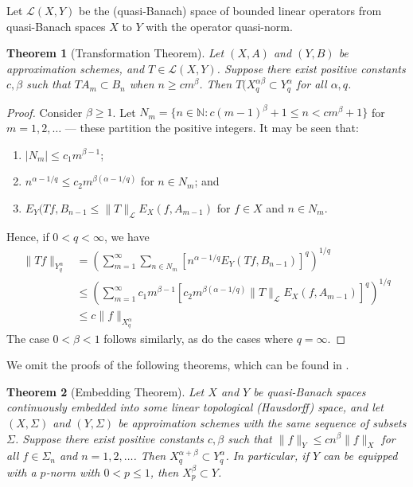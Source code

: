 \documentclass{article}
\newtheorem{theorem}{Theorem}[section]
\theoremstyle{definition}
\theoremstyle{remark}
\begin{document}
Let $\mathcal{L}(X,Y)$ be the (quasi-Banach) space of bounded linear operators from quasi-Banach spaces $X$ to $Y$ with the operator quasi-norm.

\begin{theorem}[Transformation Theorem]
    Let $(X,A)$ and $(Y,B)$ be approximation schemes, and $T \in \mathcal{L}(X,Y)$. Suppose there exist positive constants $c,\beta$ such that $TA_m \subset B_n$ when $n \geq cm^\beta$. Then $T(X_q^{\alpha\beta} \subset Y_q^\alpha$ for all $\alpha,q$. 
\end{theorem}

\begin{proof}
    Consider $\beta \geq 1$. Let $N_m = \{ n \in \mathbb{N}: c(m-1)^\beta + 1 \leq n < cm^\beta + 1 \}$ for $m = 1,2,\ldots$ --- these partition the positive integers. It may be seen that:
    \begin{enumerate}
        \item $|N_m| \leq c_1m^{\beta-1}$;
        \item $n^{\alpha-1/q} \leq c_2m^{\beta(\alpha-1/q)}$ for $n \in N_m$; and
        \item $E_Y(Tf,B_{n-1} \leq \lVert T \rVert_\mathcal{L}E_X(f,A_{m-1})$ for $f \in X$ and $n \in N_m$.
    \end{enumerate}
    Hence, if $0 < q < \infty$, we have
    \begin{align*}
        \lVert Tf \rVert_{Y_q^\alpha} &= \left( \sum_{m=1}^\infty \sum_{n \in N_m} [n^{\alpha-1/q}E_Y(Tf,B_{n-1})]^q \right)^{1/q} \\
        &\leq \left( \sum_{m=1}^\infty c_1m^{\beta-1}[c_2m^{\beta(\alpha-1/q)}\lVert T \rVert_\mathcal{L}E_X(f,A_{m-1})]^q \right)^{1/q} \\
        &\leq c\lVert f \rVert_{X_q^\alpha}
    \end{align*}
    The case $0 < \beta < 1$ follows similarly, as do the cases where $q = \infty$.
\end{proof}

We omit the proofs of the following theorems, which can be found in \cite{pietsch_approximation_1981}.

\begin{theorem}[Embedding Theorem]
    Let $X$ and $Y$ be quasi-Banach spaces continuously embedded into some linear topological (Hausdorff) space, and let $(X,\Sigma)$ and $(Y,\Sigma)$ be approimation schemes with the same sequence of subsets $\Sigma$. Suppose there exist positive constants $c,\beta$ such that $\lVert f \rVert_Y \leq cn^\beta\lVert f \rVert_X$ for all $f \in \Sigma_n$ and $n = 1,2,\ldots$. Then $X_q^{\alpha+\beta} \subset Y_q^\alpha$. In particular, if $Y$ can be equipped with a $p$-norm with $0 < p \leq 1$, then $X_p^\beta \subset Y$.
\end{theorem}
\end{document}
